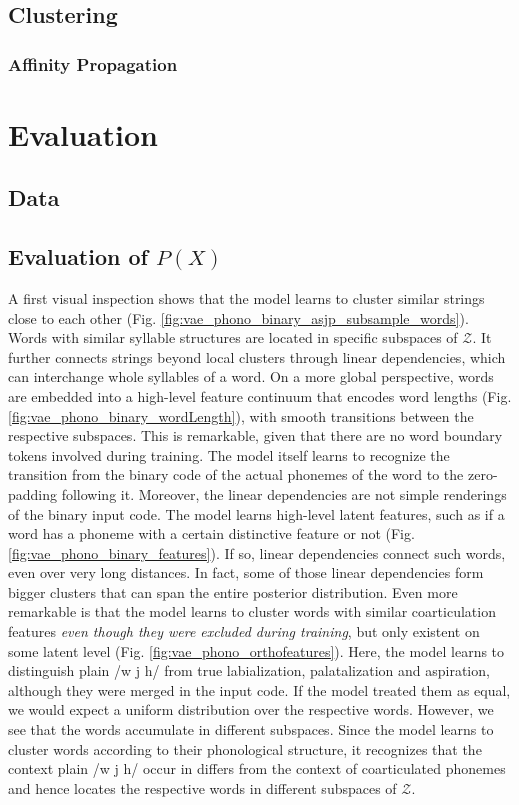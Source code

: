 \documentclass[6pt]{article}
\begin{document}
{\subsection{Clustering}
\subsubsection{Affinity Propagation}
\section{Evaluation}
\subsection{Data}
\subsection{Evaluation of $P(X)$}

A first visual inspection shows that the model learns to cluster similar strings close to each other (Fig. \ref{fig:vae_phono_binary_asjp_subsample_words}). Words with similar syllable structures are located in specific subspaces of $\mathcal{Z}$. It further connects strings beyond local clusters through linear dependencies, which can interchange whole syllables of a word. 
On a more global perspective, words are embedded into a high-level feature continuum that encodes word lengths (Fig. \ref{fig:vae_phono_binary_wordLength}), with smooth transitions between the respective subspaces. This is remarkable, given that there are no word boundary tokens involved during training. The model itself learns to recognize the transition from the binary code of the actual phonemes of the word to the zero-padding following it.
Moreover, the linear dependencies are not simple renderings of the binary input code. The model learns high-level latent features, such as if a word has a phoneme with a certain distinctive feature or not (Fig. \ref{fig:vae_phono_binary_features}). If so, linear dependencies connect such words, even over very long distances. In fact, some of those linear dependencies form bigger clusters that can span the entire posterior distribution. 
Even more remarkable is that the model learns to cluster words with similar coarticulation features \textit{even though they were excluded during training}, but only existent on some latent level (Fig. \ref{fig:vae_phono_orthofeatures}). Here, the model learns to distinguish plain /w j h/ from true labialization, palatalization and aspiration, although they were merged in the input code. If the model treated them as equal, we would expect a uniform distribution over the respective words. However, we see that the words accumulate in different subspaces. Since the model learns to cluster words according to their phonological structure, it recognizes that the context plain /w j h/ occur in differs from the context of coarticulated phonemes and hence locates the respective words in different subspaces of $\mathcal{Z}$.

}
\end{document}

